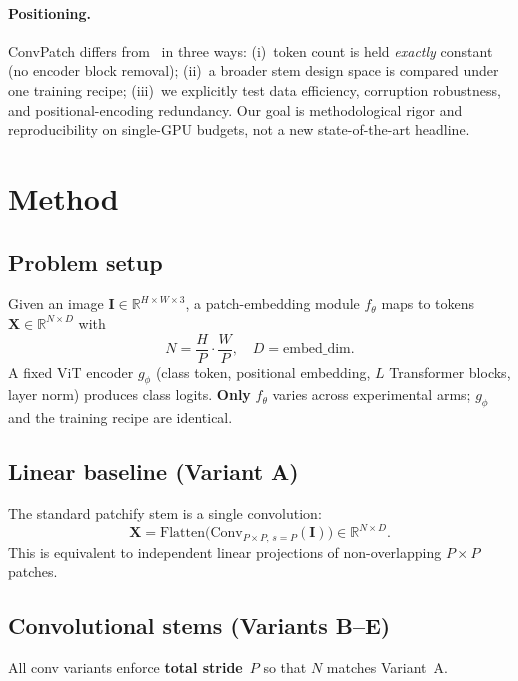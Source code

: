 \documentclass[10pt,twocolumn]{article}
\begin{document}
\paragraph{Positioning.}
ConvPatch differs from~\cite{xiao2021early} in three ways: (i)~token count is held \emph{exactly} constant (no encoder block removal); (ii)~a broader stem design space is compared under one training recipe; (iii)~we explicitly test data efficiency, corruption robustness, and positional-encoding redundancy.
Our goal is methodological rigor and reproducibility on single-GPU budgets, not a new state-of-the-art headline.

\section{Method}
\label{sec:method}

\subsection{Problem setup}

Given an image $\mathbf{I} \in \mathbb{R}^{H \times W \times 3}$, a patch-embedding module $f_\theta$ maps to tokens $\mathbf{X} \in \mathbb{R}^{N \times D}$ with
\[
N = \frac{H}{P}\cdot\frac{W}{P}, \quad D = \text{embed\_dim}.
\]
A fixed ViT encoder $g_\phi$ (class token, positional embedding, $L$ Transformer blocks, layer norm) produces class logits.
\textbf{Only} $f_\theta$ varies across experimental arms; $g_\phi$ and the training recipe are identical.

\subsection{Linear baseline (Variant A)}

The standard patchify stem is a single convolution:
\[
\mathbf{X} = \mathrm{Flatten}\bigl(\mathrm{Conv}_{P\times P,\, s=P}(\mathbf{I})\bigr) \in \mathbb{R}^{N \times D}.
\]
This is equivalent to independent linear projections of non-overlapping $P{\times}P$ patches.

\subsection{Convolutional stems (Variants B--E)}

All conv variants enforce \textbf{total stride}~$P$ so that $N$ matches Variant~A.
\end{document}
